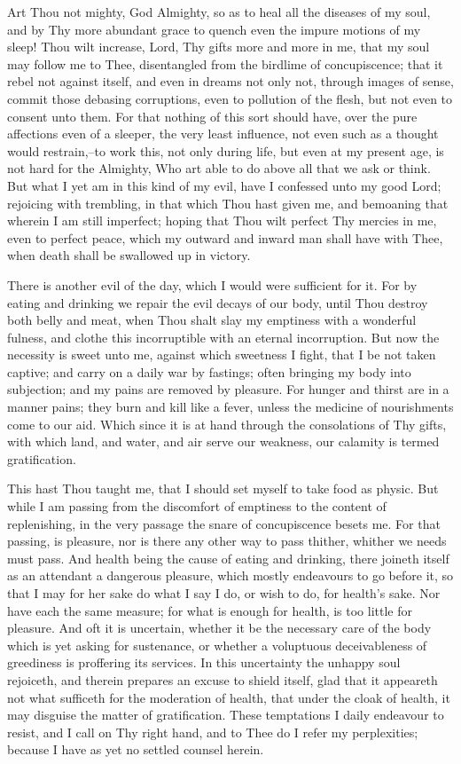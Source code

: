 \documentclass[b5paper,openright,12pt,twoside]{book}
\begin{document}
Art Thou not mighty, God Almighty, so as to heal all the diseases of my
soul, and by Thy more abundant grace to quench even the impure motions
of my sleep! Thou wilt increase, Lord, Thy gifts more and more in me,
that my soul may follow me to Thee, disentangled from the birdlime of
concupiscence; that it rebel not against itself, and even in dreams not
only not, through images of sense, commit those debasing corruptions,
even to pollution of the flesh, but not even to consent unto them. For
that nothing of this sort should have, over the pure affections even of
a sleeper, the very least influence, not even such as a thought would
restrain,--to work this, not only during life, but even at my present
age, is not hard for the Almighty, Who art able to do above all that
we ask or think. But what I yet am in this kind of my evil, have I
confessed unto my good Lord; rejoicing with trembling, in that which
Thou hast given me, and bemoaning that wherein I am still imperfect;
hoping that Thou wilt perfect Thy mercies in me, even to perfect peace,
which my outward and inward man shall have with Thee, when death shall
be swallowed up in victory.

There is another evil of the day, which I would were sufficient for it.
For by eating and drinking we repair the evil decays of our body, until
Thou destroy both belly and meat, when Thou shalt slay my emptiness
with a wonderful fulness, and clothe this incorruptible with an eternal
incorruption. But now the necessity is sweet unto me, against which
sweetness I fight, that I be not taken captive; and carry on a daily war
by fastings; often bringing my body into subjection; and my pains are
removed by pleasure. For hunger and thirst are in a manner pains; they
burn and kill like a fever, unless the medicine of nourishments come
to our aid. Which since it is at hand through the consolations of Thy
gifts, with which land, and water, and air serve our weakness, our
calamity is termed gratification.

This hast Thou taught me, that I should set myself to take food as
physic. But while I am passing from the discomfort of emptiness to the
content of replenishing, in the very passage the snare of concupiscence
besets me. For that passing, is pleasure, nor is there any other way to
pass thither, whither we needs must pass. And health being the cause of
eating and drinking, there joineth itself as an attendant a dangerous
pleasure, which mostly endeavours to go before it, so that I may for her
sake do what I say I do, or wish to do, for health's sake. Nor have
each the same measure; for what is enough for health, is too little for
pleasure. And oft it is uncertain, whether it be the necessary care of
the body which is yet asking for sustenance, or whether a voluptuous
deceivableness of greediness is proffering its services. In this
uncertainty the unhappy soul rejoiceth, and therein prepares an excuse
to shield itself, glad that it appeareth not what sufficeth for the
moderation of health, that under the cloak of health, it may disguise
the matter of gratification. These temptations I daily endeavour
to resist, and I call on Thy right hand, and to Thee do I refer my
perplexities; because I have as yet no settled counsel herein.
\end{document}

